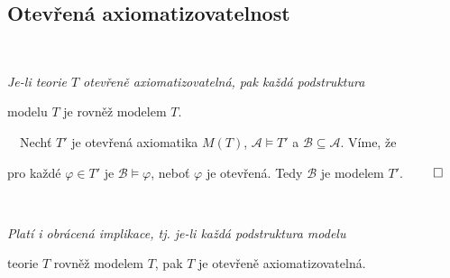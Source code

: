     

\subsection{Otevřená axiomatizovatelnost}\todo

{\bf {}}\ \ {\it Je-li teorie $T$ otevřeně axiomatizovatelná, pak každá podstruktura
\smallskip

modelu $T$ je rovněž modelem $T$.}
\medskip

{\it {}}\ \ Nechť $T'$ je otevřená axiomatika $M(T)$, $\mathcal{A}\models T'$ a $\mathcal{B}\subseteq \mathcal{A}$. Víme, že
\smallskip

pro každé $\varphi\in T'$ je $\mathcal{B}\models \varphi$, neboť $\varphi$ je otevřená. Tedy $\mathcal{B}$ je modelem $T'$. $\qed$
\bigskip

{\it {}}\ \ {\it Platí i obrácená implikace, tj. je-li každá podstruktura modelu
\smallskip

teorie $T$ rovněž modelem $T$, pak $T$ je otevřeně axiomatizovatelná.}
\bigskip

\smallskip

\medskip

\vspace{-2mm}

\vspace{-4mm}



